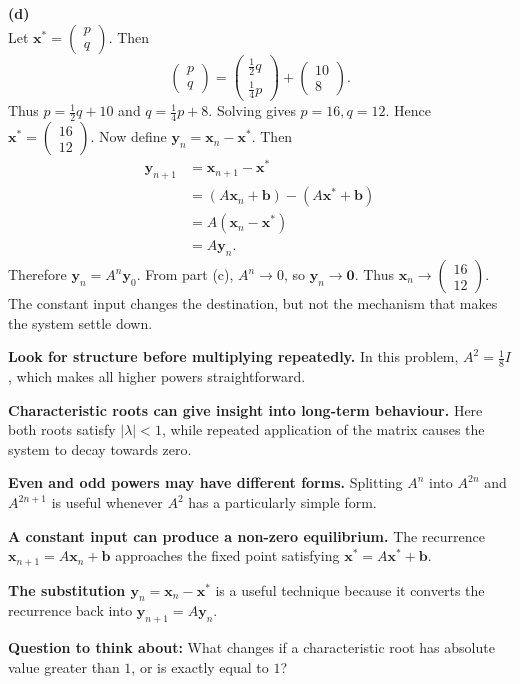 \begin{solution}
\textbf{(d)}\\
Let $\mathbf{x}^* = \begin{pmatrix} p\\q \end{pmatrix}$. Then
\[ \begin{pmatrix} p\\q \end{pmatrix} = \begin{pmatrix} \frac12q\\[1mm] \frac14p \end{pmatrix} + \begin{pmatrix} 10\\8 \end{pmatrix}. \]
Thus $p=\frac12q+10$ and $q=\frac14p+8$.
Solving gives $p=16, q=12$. Hence $\boxed{ \mathbf{x}^* = \begin{pmatrix} 16\\12 \end{pmatrix} }$.
Now define $\mathbf{y}_n=\mathbf{x}_n-\mathbf{x}^*$. Then
\begin{align*} \mathbf{y}_{n+1} &=\mathbf{x}_{n+1}-\mathbf{x}^*\\ &=(A\mathbf{x}_n+\mathbf b) -(A\mathbf{x}^*+\mathbf b)\\ &=A(\mathbf{x}_n-\mathbf{x}^*)\\ &=A\mathbf{y}_n. \end{align*}
Therefore $\mathbf{y}_n=A^n\mathbf{y}_0$. From part (c), $A^n\to0$, so $\mathbf{y}_n\to\mathbf0$. Thus $\boxed{ \mathbf{x}_n\to \begin{pmatrix} 16\\12 \end{pmatrix} }$.
The constant input changes the destination, but not the mechanism that makes the system settle down.
\end{solution}

\begin{takeaways}
\item \textbf{Look for structure before multiplying repeatedly.} In this problem, $A^2=\frac18I$, which makes all higher powers straightforward.
\item \textbf{Characteristic roots can give insight into long-term behaviour.} Here both roots satisfy $|\lambda|<1$, while repeated application of the matrix causes the system to decay towards zero.
\item \textbf{Even and odd powers may have different forms.} Splitting $A^n$ into $A^{2n}$ and $A^{2n+1}$ is useful whenever $A^2$ has a particularly simple form.
\item \textbf{A constant input can produce a non-zero equilibrium.} The recurrence $\mathbf{x}_{n+1}=A\mathbf{x}_n+\mathbf b$ approaches the fixed point satisfying $\mathbf{x}^*=A\mathbf{x}^*+\mathbf b$.
\item \textbf{The substitution $\mathbf{y}_n=\mathbf{x}_n-\mathbf{x}^*$} is a useful technique because it converts the recurrence back into $\mathbf{y}_{n+1}=A\mathbf{y}_n$.
\item \textbf{Question to think about:} What changes if a characteristic root has absolute value greater than $1$, or is exactly equal to $1$?
\end{takeaways}

